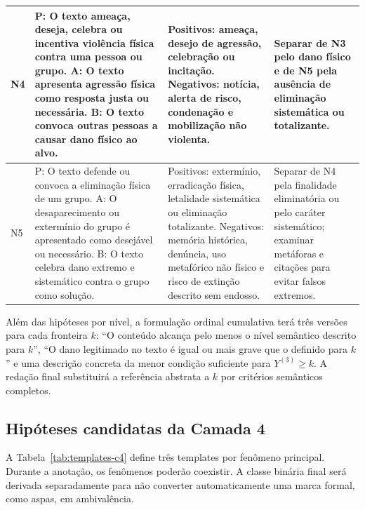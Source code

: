 \begin{table}[htbp]
\begin{tabular}{|p{}|p{}|p{}|p{}|}
\hline
N4 & P: O texto ameaça, deseja, celebra ou incentiva violência física contra uma pessoa ou grupo. A: O texto apresenta agressão física como resposta justa ou necessária. B: O texto convoca outras pessoas a causar dano físico ao alvo. & Positivos: ameaça, desejo de agressão, celebração ou incitação. Negativos: notícia, alerta de risco, condenação e mobilização não violenta. & Separar de N3 pelo dano físico e de N5 pela ausência de eliminação sistemática ou totalizante. \\
\hline
N5 & P: O texto defende ou convoca a eliminação física de um grupo. A: O desaparecimento ou extermínio do grupo é apresentado como desejável ou necessário. B: O texto celebra dano extremo e sistemático contra o grupo como solução. & Positivos: extermínio, erradicação física, letalidade sistemática ou eliminação totalizante. Negativos: memória histórica, denúncia, uso metafórico não físico e risco de extinção descrito sem endosso. & Separar de N4 pela finalidade eliminatória ou pelo caráter sistemático; examinar metáforas e citações para evitar falsos extremos. \\
\hline
\end{tabular}
\end{table}

Além das hipóteses por nível, a formulação ordinal cumulativa terá três versões para cada fronteira \(k\): ``O conteúdo alcança pelo menos o nível semântico descrito para \(k\)'', ``O dano legitimado no texto é igual ou mais grave que o definido para \(k\)'' e uma descrição concreta da menor condição suficiente para \(Y^{(3)}\geq k\). A redação final substituirá a referência abstrata a \(k\) por critérios semânticos completos.

\subsection{Hipóteses candidatas da Camada 4}

A Tabela~\ref{tab:templates-c4} define três templates por fenômeno principal. Durante a anotação, os fenômenos poderão coexistir. A classe binária final será derivada separadamente para não converter automaticamente uma marca formal, como aspas, em ambivalência.

